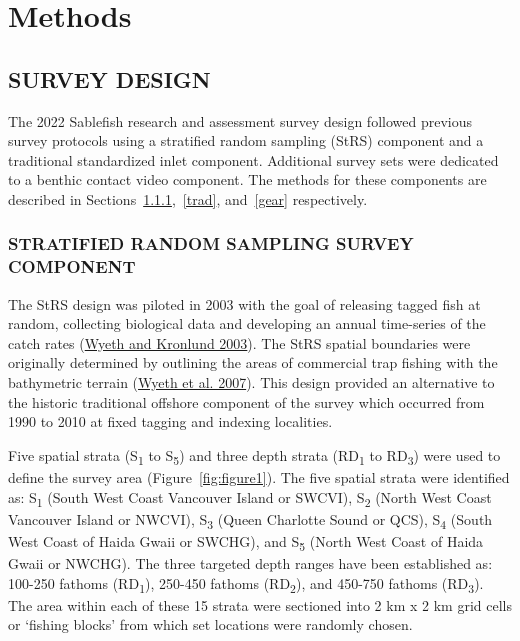 \documentclass[12pt]{article}\usepackage[]{graphicx}\usepackage[]{color}
\begin{document}
\clearpage

\hypertarget{methods}{%
\section{Methods}\label{methods}}

\hypertarget{survey-design}{%
\subsection{SURVEY DESIGN}\label{survey-design}}

The 2022 Sablefish research and assessment survey design followed previous survey protocols using a stratified random sampling (StRS) component and a traditional standardized inlet component. Additional survey sets were dedicated to a benthic contact video component. The methods for these components are described in Sections~\ref{strs},~\ref{trad}, and~\ref{gear} respectively.

\hypertarget{strs}{%
\subsubsection{STRATIFIED RANDOM SAMPLING SURVEY COMPONENT}\label{strs}}

The StRS design was piloted in 2003 with the goal of releasing tagged fish at random, collecting biological data and developing an annual time-series of the catch rates (\protect\hyperlink{ref-Wyeth2003}{Wyeth and Kronlund 2003}). The StRS spatial boundaries were originally determined by outlining the areas of commercial trap fishing with the bathymetric terrain (\protect\hyperlink{ref-Wyeth2007}{Wyeth et al. 2007}). This design provided an alternative to the historic traditional offshore component of the survey which occurred from 1990 to 2010 at fixed tagging and indexing localities.

Five spatial strata (S\textsubscript{1} to S\textsubscript{5}) and three depth strata (RD\textsubscript{1} to RD\textsubscript{3}) were used to define the survey area (Figure~\ref{fig:figure1}). The five spatial strata were identified as: S\textsubscript{1} (South West Coast Vancouver Island or SWCVI), S\textsubscript{2} (North West Coast Vancouver Island or NWCVI), S\textsubscript{3} (Queen Charlotte Sound or QCS), S\textsubscript{4} (South West Coast of Haida Gwaii or SWCHG), and S\textsubscript{5} (North West Coast of Haida Gwaii or NWCHG). The three targeted depth ranges have been established as: 100-250 fathoms (RD\textsubscript{1}), 250-450 fathoms (RD\textsubscript{2}), and 450-750 fathoms (RD\textsubscript{3}). The area within each of these 15 strata were sectioned into 2 km x 2 km grid cells or `fishing blocks' from which set locations were randomly chosen.
\end{document}
